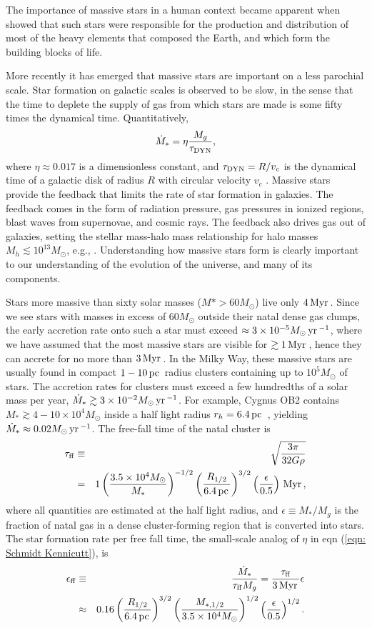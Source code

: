\documentclass[iop,apj,numberedappendix]{emulateapj}
\newcommand       \be		{\begin{equation}}
\newcommand       \ee		{\end{equation}}
\newcommand       \bea          {\begin{eqnarray}}
\newcommand       \eea          {\end{eqnarray}}
\newcommand       \pc		{\,{\rm pc \,}}
\newcommand       \yr		{\,{\rm yr \,}}
\newcommand       \Myr		{\,{\rm Myr \,}}
\newcommand       \eff          {\epsilon_{\rm ff}}
\newcommand       \tff          {\tau_{\rm ff}}
\newcommand       \tDyn         {\tau_{\rm DYN}}
\begin{document}
The importance of massive stars in a human context became apparent 
when \citet{1957RvMP...29..547B} showed that such stars were
responsible for the production and distribution of most of the heavy
elements that composed the Earth, and which form the building blocks
of life. 

More recently it has emerged that massive stars are important
on a less parochial scale. Star formation on galactic scales is
observed to be slow, in the sense that the time to deplete the supply
of gas from which stars are made is some fifty times the dynamical
time. Quantitatively,
%
\be \label{eqn: Schmidt Kennicutt} %
\dot M_*=\eta {M_g\over \tDyn},
\ee  %
%
where $\eta\approx0.017$ is a dimensionless constant, and
$\tDyn=R/v_c$ is the dynamical time of a galactic disk of radius $R$
with circular velocity $v_c$
\citep{1998ApJ...498..541K,2008AJ....136.2782L}. Massive stars provide
the feedback that limits the rate of star formation in galaxies. The
feedback comes in the form of radiation pressure, gas pressures in
ionized regions, blast waves from supernovae, and cosmic rays. The
feedback also drives gas out of galaxies, setting the stellar
mass-halo mass relationship for halo masses
$M_h\lesssim10^{13}M_\odot$, e.g.,
\citet{2013arXiv1311.2073H,2014arXiv1404.2613A,2014MNRAS.442.1545C}. Understanding
how massive stars form is clearly important to our understanding of
the evolution of the universe, and many of its components.

Stars more massive than sixty solar masses ($M*>60M_\odot$) live only
$4\Myr$. Since we see stars with masses in excess of $60M_\odot$ outside
their natal dense gas clumps, the early accretion rate onto such a
star must exceed $\approx3\times10^{-5}M_\odot\yr^{-1}$, where we have
assumed that the most massive stars are visible for $\gtrsim1\Myr$, hence
they can accrete for no more than $3\Myr$. In the Milky Way, these
massive stars are usually found in compact $1-10\pc$ radius clusters
containing up to $10^5M_\odot$ of stars.  The accretion rates for
clusters must exceed a few hundredths of a solar mass per year, $\dot
M_*\gtrsim 3\times10^{-2}M_\odot\yr^{-1}$. For example, Cygnus OB2
contains $M_*\gtrsim 4-10\times10^4M_\odot$ inside a half light radius
$r_h=6.4\pc$ \citep{2000A&A...360..539K}, yielding $\dot M_*\approx
0.02M_\odot\yr^{-1}$. The free-fall time of the natal cluster is
%
\bea  %
\tff&\equiv&\sqrt{3\pi\over 32G\rho}\nonumber\\
&=&1\left({3.5\times10^{4}M_\odot\over M_*}\right)^{-1/2}
\left({R_{1/2}\over6.4\pc}\right)^{3/2}
\left({\epsilon\over0.5}\right)\Myr,
\eea  %
%
where all quantities are estimated at the half light radius, and
$\epsilon\equiv M_*/M_g$ is the fraction of natal gas in a dense
cluster-forming region that is converted into stars. The star
formation rate per free fall time, the small-scale analog of $\eta$ in
eqn (\ref{eqn: Schmidt Kennicutt}), is
%
\bea  %
\eff&\equiv&{\dot M_*\over \tff M_g}
={\tff\over 3\Myr}\epsilon\nonumber\\
&\approx&0.16
\left({R_{1/2}\over 6.4\pc}\right)^{3/2}
\left({M_{*,1/2}\over 3.5\times10^4M_\odot}\right)^{1/2}
\left({\epsilon\over 0.5}\right)^{1/2}.
\eea  %
%
\end{document}
